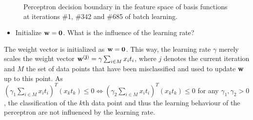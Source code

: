 \documentclass[a4]{article}
\begin{document}
\begin{figure}[h!]
\centering
\caption{Perceptron decision boundary in the feature space of basis functions at iterations \#1, \#342 and \#685 of batch learning.}
\label{fig:transBA}
\end{figure}
\begin{itemize}
\item Initialize ${\bf w} = {\bf 0}$. What is the influence of the learning rate?
\end{itemize}
The weight vector is initialized as ${\bf w} = {\bf 0}$. This way, the learning rate $\gamma$ merely scales the weight vector ${\bf w^{(j)}} = \gamma \sum_{i\in M}x_it_i$, where $j$ denotes the current iteration and $M$ the set of data points that have been misclassified and used to update {\bf w} up to this point. As $(\gamma_1 \sum_{i\in M}x_it_i)^T (x_kt_k) \leq 0 \Leftrightarrow  (\gamma_2 \sum_{i\in M}x_it_i)^T (x_kt_k) \leq 0$ for any $\gamma_1, \gamma_2 > 0$, the classification of the $k$th data point and thus the learning behaviour of the perceptron are not influenced by the learning rate.

\FloatBarrier
\end{document}
